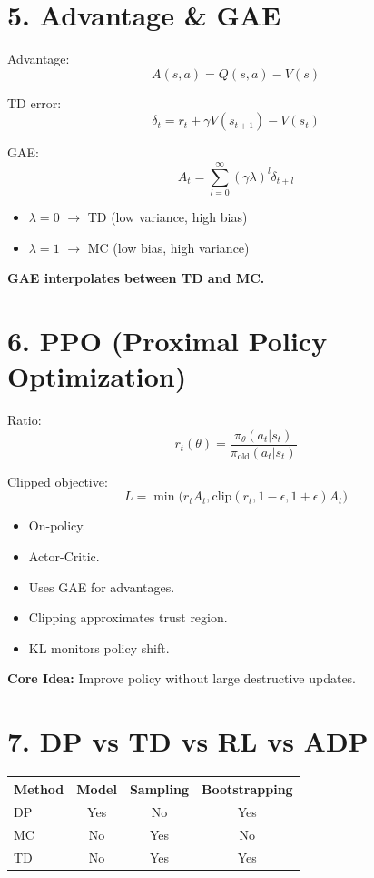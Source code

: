 \documentclass[11pt]{article}
\begin{document}
\vspace{1em}

\section*{5. Advantage \& GAE}

Advantage:
\[
A(s,a) = Q(s,a) - V(s)
\]

TD error:
\[
\delta_t = r_t + \gamma V(s_{t+1}) - V(s_t)
\]

GAE:
\[
A_t = \sum_{l=0}^{\infty} (\gamma \lambda)^l \delta_{t+l}
\]

\begin{itemize}
\item $\lambda=0$ $\rightarrow$ TD (low variance, high bias)
\item $\lambda=1$ $\rightarrow$ MC (low bias, high variance)
\end{itemize}

\textbf{GAE interpolates between TD and MC.}

\vspace{1em}

\section*{6. PPO (Proximal Policy Optimization)}

Ratio:
\[
r_t(\theta) =
\frac{\pi_\theta(a_t|s_t)}
{\pi_{\text{old}}(a_t|s_t)}
\]

Clipped objective:
\[
L =
\min\Big(
r_t A_t,
\text{clip}(r_t, 1-\epsilon, 1+\epsilon)A_t
\Big)
\]

\begin{itemize}
\item On-policy.
\item Actor-Critic.
\item Uses GAE for advantages.
\item Clipping approximates trust region.
\item KL monitors policy shift.
\end{itemize}

\textbf{Core Idea:} Improve policy without large destructive updates.

\vspace{1em}

\section*{7. DP vs TD vs RL vs ADP}

\begin{center}
\begin{tabular}{lccc}
\toprule
Method & Model & Sampling & Bootstrapping \\
\midrule
DP & Yes & No & Yes \\
MC & No & Yes & No \\
TD & No & Yes & Yes \\
\bottomrule
\end{tabular}
\end{center}
\end{document}
